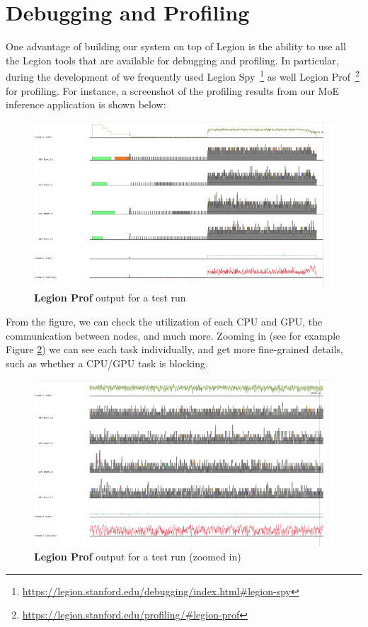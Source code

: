 \section{Debugging and Profiling}
One advantage of building our system on top of Legion is the ability to use all the Legion tools that are available for debugging and profiling. In particular, during the development of \Project we frequently used Legion Spy~\footnote{\url{https://legion.stanford.edu/debugging/index.html\#legion-spy}} as well Legion Prof~\footnote{\url{https://legion.stanford.edu/profiling/\#legion-prof}} for profiling. For instance, a screenshot of the profiling results from our MoE inference application is shown below:
\begin{figure}[H]
    \centering
    \includegraphics[width=\linewidth]{figures/legion_prof0.png}
    \caption{\textbf{Legion Prof} output for a \Project test run}
    \label{fig:legion-prof0}
\end{figure}
From the figure, we can check the utilization of each CPU and GPU, the communication between nodes, and much more. Zooming in (see for example Figure \ref{fig:legion-prof1}) we can see each task individually, and get more fine-grained details, such as whether a CPU/GPU task is blocking.
\begin{figure}[H]
    \centering
    \includegraphics[width=\linewidth]{figures/legion_prof1.png}
    \caption{\textbf{Legion Prof} output for a \Project test run (zoomed in)}
    \label{fig:legion-prof1}
\end{figure}